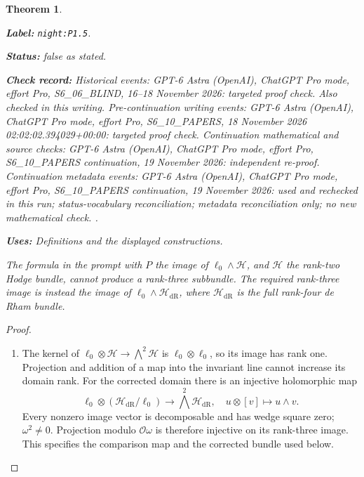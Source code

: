 \documentclass[11pt,a4paper]{article}
\newtheorem{theorem}{Theorem}[section]
\theoremstyle{definition}
\newcommand{\StatementRecord}[4]{\par\smallskip\begingroup\upshape\raggedright\noindent\textbf{Label:} \nolinkurl{#1}.\par\noindent\textbf{Status:} #2.\par\noindent\textbf{Check record:} #3.\par\noindent\textbf{Uses:} #4.\par\endgroup\smallskip}
\begin{document}
\begin{theorem}\label{night:P1.5}
\StatementRecord{night:P1.5}{false as stated}{Historical events: GPT-6 Astra (OpenAI), ChatGPT Pro mode, effort Pro, S6\_06\_BLIND, 16--18 November 2026: targeted proof check. Also checked in this writing. Pre-continuation writing events: GPT-6 Astra (OpenAI), ChatGPT Pro mode, effort Pro, S6\_10\_PAPERS, 18 November 2026 02:02:02.394029+00:00: targeted proof check. Continuation mathematical and source checks: GPT-6 Astra (OpenAI), ChatGPT Pro mode, effort Pro, S6\_10\_PAPERS continuation, 19 November 2026: independent re-proof. Continuation metadata events: GPT-6 Astra (OpenAI), ChatGPT Pro mode, effort Pro, S6\_10\_PAPERS continuation, 19 November 2026: used and rechecked in this run; status-vocabulary reconciliation; metadata reconciliation only; no new mathematical check. }{Definitions and the displayed constructions}
The formula in the prompt with $P$ the image of
$\ell_0\wedge\mathcal H$, and $\mathcal H$ the rank-two Hodge bundle,
cannot produce a rank-three subbundle.  The required rank-three image
is instead the image of $\ell_0\wedge\mathcal H_{\mathrm{dR}}$, where
$\mathcal H_{\mathrm{dR}}$ is the full rank-four de Rham bundle.
\end{theorem}
\begin{proof}
\begin{enumerate}[label=\arabic*.]
\item The kernel of $\ell_0\otimes\mathcal H\to\bigwedge^2\mathcal H$
is $\ell_0\otimes\ell_0$, so its image has rank one.  Projection and
addition of a map into the invariant line cannot increase its domain
rank.  For the corrected domain there is an injective holomorphic map
\[
\ell_0\otimes(\mathcal H_{\mathrm{dR}}/\ell_0)
 \longrightarrow\bigwedge^2\mathcal H_{\mathrm{dR}},\quad
u\otimes[v]\longmapsto u\wedge v.
\]
Every nonzero image vector is decomposable and has wedge square zero;
$\omega^2\ne0$.  Projection modulo $\mathcal O\omega$ is therefore
injective on its rank-three image.  This specifies the comparison map
and the corrected bundle used below.

\end{enumerate}
\end{proof}
\end{document}
